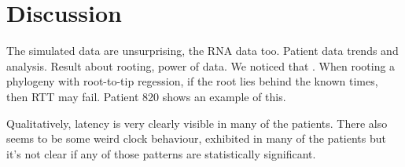 \section{Discussion} \label{sec:discuss}
The simulated data are unsurprising, the RNA data too. 
Patient data trends and analysis. 
Result about rooting, power of data.
We noticed that . 
When rooting a phylogeny with root-to-tip regession, if the root lies behind the known times, then RTT may fail. 
Patient 820 shows an example of this.

Qualitatively, latency is very clearly visible in many of the patients. 
There also seems to be some weird clock behaviour, exhibited in many of the patients but it's not clear if any of those patterns are statistically significant. 
